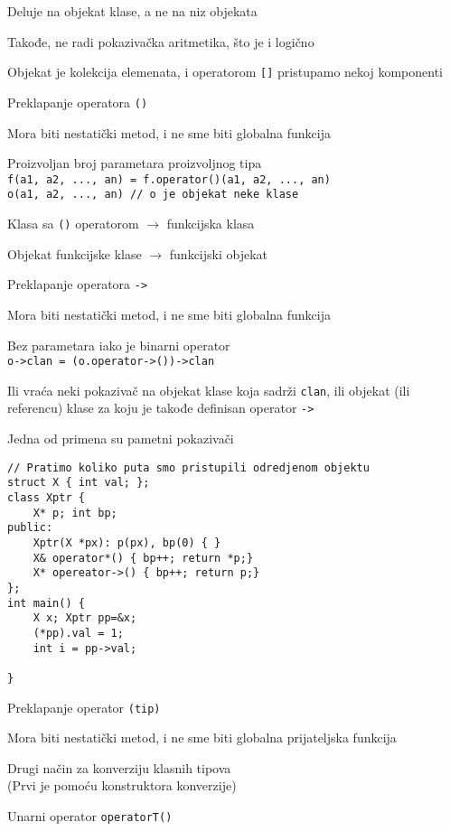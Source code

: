 \documentclass{article}
\newenvironment{xitemize}{%
    
    \itemize
    \larger
}{%
    \enditemize
}
\let\olditemize\itemize
\let\endolditemize\enditemize
\renewenvironment{itemize}{%
    \smaller
    \olditemize
}{%
    \endolditemize
}
\providecommand{\inlinecode}[1]{\texttt{#1}}
\begin{document}
\begin{xitemize}
\begin{itemize}
    \item Deluje na objekat klase, a ne na niz objekata
    \item Takođe, ne radi pokazivačka aritmetika, što je i logično
    \item Objekat je kolekcija elemenata, i operatorom \inlinecode{[]} pristupamo nekoj komponenti
\end{itemize}
\item Preklapanje operatora \inlinecode{()}
\begin{itemize}
    \item Mora biti nestatički metod, i ne sme biti globalna funkcija
    \item Proizvoljan broj parametara proizvoljnog tipa\\
    \inlinecode{f(a1, a2, ..., an) = f.operator()(a1, a2, ..., an)}\\
    \inlinecode{o(a1, a2, ..., an) // o je objekat neke klase}
    \item Klasa sa \inlinecode{()} operatorom $\rightarrow$ funkcijska klasa
    \item Objekat funkcijske klase $\rightarrow$ funkcijski objekat
\end{itemize}
\item Preklapanje operatora \inlinecode{->}
\begin{itemize}
    \item Mora biti nestatički metod, i ne sme biti globalna funkcija
    \item Bez parametara iako je binarni operator\\
    \inlinecode{o->clan = (o.operator->())->clan}
    \item Ili vraća neki pokazivač na objekat klase koja sadrži \inlinecode{clan}, ili objekat (ili referencu) klase za koju je takođe definisan operator \inlinecode{->}
    \item Jedna od primena su pametni pokazivači
    \begin{lstlisting}
// Pratimo koliko puta smo pristupili odredjenom objektu
struct X { int val; };
class Xptr {
    X* p; int bp;
public:
    Xptr(X *px): p(px), bp(0) { }
    X& operator*() { bp++; return *p;}
    X* opereator->() { bp++; return p;}
};
int main() {
    X x; Xptr pp=&x;
    (*pp).val = 1;
    int i = pp->val;

}
    \end{lstlisting}
\end{itemize}
\item Preklapanje operator \inlinecode{(tip)}
\begin{itemize}
    \item Mora biti nestatički metod, i ne sme biti globalna prijateljska funkcija
    \item Drugi način za konverziju klasnih tipova\\
    (Prvi je pomoću konstruktora konverzije)
    \item Unarni operator \inlinecode{operatorT()}
    

\end{itemize}
\end{xitemize}
\end{document}
